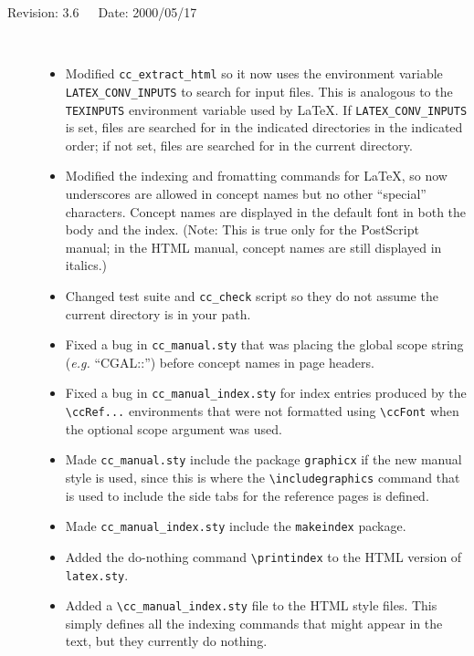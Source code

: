 \documentclass[11pt]{article}
\begin{document}
\begin{description}
    \item[Revision: 3.6~~~Date: 2000/05/17]~\\[-3mm]
    \begin{itemize}
       \item  Modified \verb|cc_extract_html| so it now uses the environment
              variable \verb|LATEX_CONV_INPUTS| to search for input files.
              This is analogous to the \verb|TEXINPUTS| environment variable
              used by \LaTeX.  If
              \verb|LATEX_CONV_INPUTS| is set, files are searched for in the
              indicated directories in the indicated order; if not set, files
              are searched for in the current directory.
       \item  Modified the indexing and fromatting commands for \LaTeX, so
              now underscores are allowed in concept names but no other
              ``special'' characters.  Concept names are displayed in the
              default font in both the body and the index. (Note: This
              is true only for the PostScript manual; in the HTML manual,
              concept names are still displayed in italics.)
       \item  Changed test suite and {\tt cc\_check} script so they do
              not assume the current directory is in your path.
       \item  Fixed a bug in \verb|cc_manual.sty| that was placing the global
              scope string ({\em e.g.} ``CGAL::'') before concept names in page
              headers.
       \item  Fixed a bug in \verb|cc_manual_index.sty| for index entries
              produced by the \verb|\ccRef...| environments that were not
              formatted using \verb|\ccFont| when the optional scope argument
              was used.
       \item  Made \verb|cc_manual.sty| include the package \verb|graphicx| if
              the new manual style is used, since this is where the
              \verb|\includegraphics| command that is used to include the side
              tabs for the reference pages is defined.
       \item  Made \verb|cc_manual_index.sty| include the \verb|makeindex|
              package.
       \item  Added the do-nothing command \verb|\printindex| to
              the HTML version of \verb|latex.sty|.
       \item  Added a \verb|\cc_manual_index.sty| file to the HTML style files.
              This simply defines all the indexing commands that might appear
              in the text, but they currently do nothing.
    \end{itemize}



\end{description}
\end{document}
